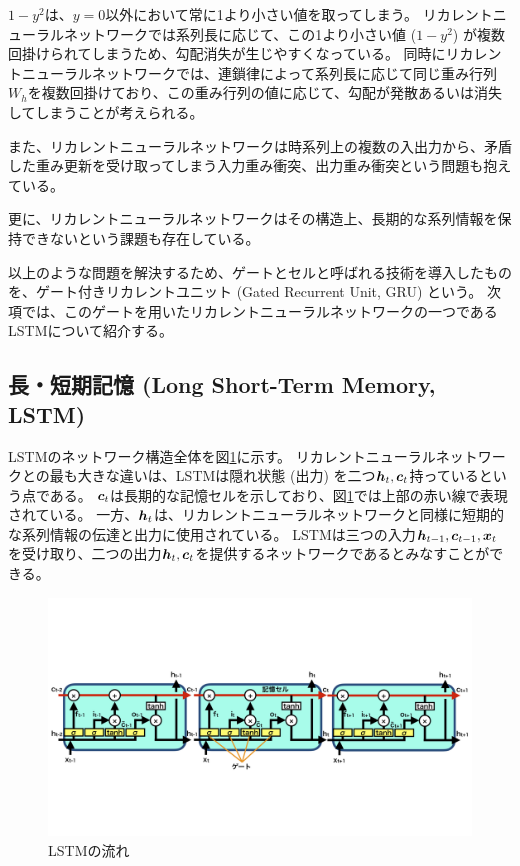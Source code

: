 $1-y^2$は、$y=0$以外において常に1より小さい値を取ってしまう。
リカレントニューラルネットワークでは系列長に応じて、この1より小さい値 ($1-y^2$) が複数回掛けられてしまうため、勾配消失が生じやすくなっている。
同時にリカレントニューラルネットワークでは、連鎖律によって系列長に応じて同じ重み行列$W_h$を複数回掛けており、この重み行列の値に応じて、勾配が発散あるいは消失してしまうことが考えられる。

また、リカレントニューラルネットワークは時系列上の複数の入出力から、矛盾した重み更新を受け取ってしまう入力重み衝突、出力重み衝突という問題も抱えている。

更に、リカレントニューラルネットワークはその構造上、長期的な系列情報を保持できないという課題も存在している。

以上のような問題を解決するため、ゲートとセルと呼ばれる技術を導入したものを、ゲート付きリカレントユニット (Gated Recurrent Unit, GRU\cite{GRU}) という。
次項では、このゲートを用いたリカレントニューラルネットワークの一つであるLSTMについて紹介する。


\subsection{長・短期記憶 (Long Short-Term Memory, LSTM)} \label{DL:RNN:LongShortTermMemory}

LSTMのネットワーク構造全体を図\ref{10LongShortTermMemory}に示す。
リカレントニューラルネットワークとの最も大きな違いは、LSTMは隠れ状態 (出力) を二つ${\mbox{\boldmath{$h$}}}_t,{\mbox{\boldmath{$c$}}}_t$持っているという点である。
${\mbox{\boldmath{$c$}}}_t$は長期的な記憶セルを示しており、図\ref{10LongShortTermMemory}では上部の赤い線で表現されている。
一方、${\mbox{\boldmath{$h$}}}_t$は、リカレントニューラルネットワークと同様に短期的な系列情報の伝達と出力に使用されている。
LSTMは三つの入力${\mbox{\boldmath{$h$}}}_{t-1},{\mbox{\boldmath{$c$}}}_{t-1},{\mbox{\boldmath{$x$}}}_t$を受け取り、二つの出力${\mbox{\boldmath{$h$}}}_t,{\mbox{\boldmath{$c$}}}_t$を提供するネットワークであるとみなすことができる。

\begin{figure}[htbp]
 \centering
 \includegraphics[trim = 0 200 0 200, width=1.0\textwidth, clip]{Figure/2DeepLearning/10LongShortTermMemory.png}
 \caption{LSTMの流れ}
 \label{10LongShortTermMemory}
\end{figure}

